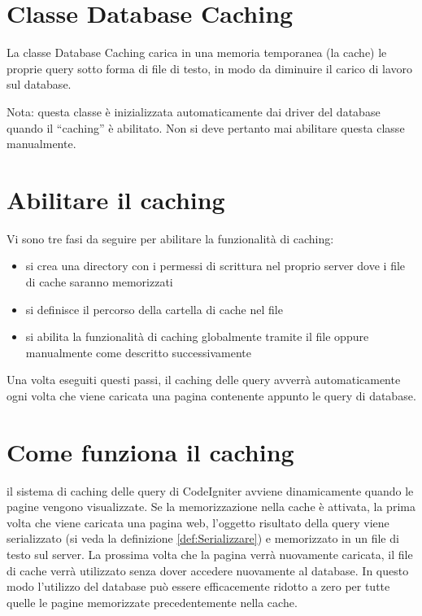 \section*{Classe Database Caching}
La classe Database Caching carica in una memoria temporanea (la cache) le proprie query sotto forma di file di testo, in modo da diminuire il carico di lavoro sul database.

Nota: questa classe è inizializzata automaticamente dai driver del database quando il ``caching'' è abilitato. Non si deve pertanto mai abilitare questa classe manualmente.

\section*{Abilitare il caching}
Vi sono tre fasi da seguire per abilitare la funzionalità di caching:

\begin{itemize}
\item si crea una directory con i permessi di scrittura nel proprio server dove i file di cache saranno memorizzati
\item si definisce il percorso della cartella di cache nel file 
\item si abilita la funzionalità di caching globalmente tramite il file  oppure manualmente come descritto successivamente
\end{itemize}

Una volta eseguiti questi passi, il caching  delle query avverrà automaticamente ogni volta che viene caricata una pagina contenente appunto le query di database.

\section*{Come funziona il caching}
il sistema di caching delle query di CodeIgniter avviene dinamicamente quando le pagine vengono visualizzate. Se la memorizzazione nella cache è attivata, la prima volta che viene caricata una pagina web, l'oggetto risultato della query viene serializzato (si veda la definizione \vref{def:Serializzare}) e memorizzato in un file di testo sul server. La prossima volta che la pagina verrà nuovamente caricata, il file di cache verrà utilizzato senza dover accedere nuovamente al database. In questo modo l'utilizzo del database può essere efficacemente ridotto a zero per tutte quelle le pagine memorizzate precedentemente nella cache.

